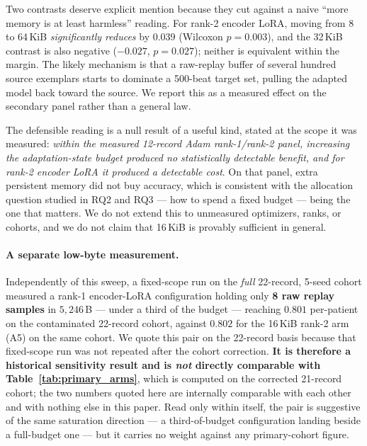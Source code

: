 Two contrasts deserve explicit mention because they cut against a naive
``more memory is at least harmless'' reading. For rank-2 encoder LoRA, moving
from 8 to 64\,KiB \emph{significantly reduces} \macrof{} by $0.039$
(Wilcoxon $p = 0.003$), and the 32\,KiB contrast is also negative
($-0.027$, $p = 0.027$); neither is equivalent within the margin. The likely
mechanism is that a raw-replay buffer of several hundred source exemplars starts
to dominate a 500-beat target set, pulling the adapted model back toward the
source. We report this as a measured effect on the secondary panel rather than a
general law.

The defensible reading is a null result of a useful kind, stated at the scope it
was measured: \emph{within the measured 12-record Adam rank-1/rank-2 panel,
increasing the adaptation-state budget produced no statistically detectable
benefit, and for rank-2 encoder LoRA it produced a detectable cost}. On that
panel, extra persistent memory did not buy accuracy, which is consistent with
the allocation question studied in RQ2 and RQ3 --- how to spend a fixed budget
--- being the one that matters. We do not extend this to unmeasured optimizers,
ranks, or cohorts, and we do not claim that 16\,KiB is provably sufficient in
general.

\paragraph{A separate low-byte measurement.}\label{sec:lowbyte} Independently of this sweep, a
fixed-scope run on the \emph{full} 22-record, 5-seed cohort measured a rank-1
encoder-LoRA configuration holding only \textbf{8 raw replay samples} in
$5{,}246$\,B --- under a third of the budget --- reaching $0.801$ per-patient
\macrof{} on the contaminated 22-record cohort, against $0.802$ for the 16\,KiB
rank-2 arm (A5) on the same cohort. We quote this pair on the 22-record basis
because that fixed-scope run was not repeated after the cohort correction.
\textbf{It is therefore a historical sensitivity result and is \emph{not}
directly comparable with Table~\ref{tab:primary_arms}}, which is computed on the
corrected 21-record cohort; the two numbers quoted here are internally
comparable with each other and with nothing else in this paper. Read only within
itself, the pair is suggestive of the same saturation direction --- a
third-of-budget configuration landing beside a full-budget one --- but it carries
no weight against any primary-cohort figure.

